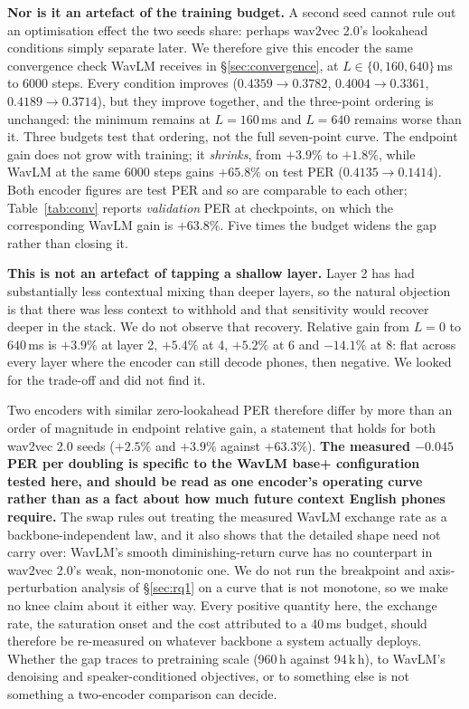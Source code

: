 \documentclass[journal]{IEEEtran}
\begin{document}
\textbf{Nor is it an artefact of the training budget.} A second seed cannot
rule out an optimisation effect the two seeds share: perhaps wav2vec 2.0's
lookahead conditions simply separate later. We therefore give this encoder the
same convergence check WavLM receives in \S\ref{sec:convergence}, at
$L\in\{0,160,640\}$\,ms to 6000 steps. Every condition improves ($0.4359
\rightarrow 0.3782$, $0.4004 \rightarrow 0.3361$, $0.4189 \rightarrow 0.3714$),
but they improve together, and the three-point ordering is unchanged: the
minimum remains at $L{=}160$\,ms and $L{=}640$ remains worse than it. Three
budgets test that ordering, not the full seven-point curve. The endpoint gain does not
grow with training; it \emph{shrinks}, from $+3.9\%$ to $+1.8\%$, while WavLM
at the same 6000 steps gains $+65.8\%$ on test PER
($0.4135\rightarrow0.1414$). Both encoder figures are test PER and so are
comparable to each other; Table~\ref{tab:conv} reports \emph{validation}
PER at checkpoints, on which the corresponding WavLM gain is $+63.8\%$. Five times the budget widens the gap
rather than closing it.

\textbf{This is not an artefact of tapping a shallow layer.} Layer 2 has had
substantially less contextual mixing than deeper layers, so the natural
objection is that there was less context to withhold and that sensitivity
would recover deeper in the stack. We do not observe that recovery. Relative gain from $L{=}0$ to $640$\,ms is $+3.9\%$ at layer 2,
$+5.4\%$ at 4, $+5.2\%$ at 6 and $-14.1\%$ at 8: flat across every layer
where the encoder can still decode phones, then negative. We looked for the
trade-off and did not find it.

Two encoders with similar zero-lookahead PER therefore differ by more than an
order of magnitude in endpoint relative gain, a statement that holds for
both wav2vec 2.0 seeds ($+2.5\%$ and $+3.9\%$ against $+63.3\%$). \textbf{The measured $-0.045$ PER per doubling is specific to the WavLM
base+ configuration tested here, and should be read as one encoder's operating
curve rather than as a fact about how much future context English phones
require.} The swap rules out treating the
measured WavLM exchange rate as a backbone-independent law, and it also shows that the detailed
shape need not carry over: WavLM's smooth diminishing-return curve has no
counterpart in wav2vec 2.0's weak, non-monotonic one. We do not run the
breakpoint and axis-perturbation analysis of \S\ref{sec:rq1} on a curve that
is not monotone, so we make no knee claim about it either way. Every positive
quantity here, the exchange rate, the saturation onset and the cost attributed
to a 40\,ms budget, should therefore be re-measured on whatever backbone a
system actually deploys. Whether the gap traces to pretraining scale (960\,h against
94\,k\,h), to WavLM's denoising and speaker-conditioned objectives, or to
something else is not something a two-encoder comparison can decide.
\end{document}
